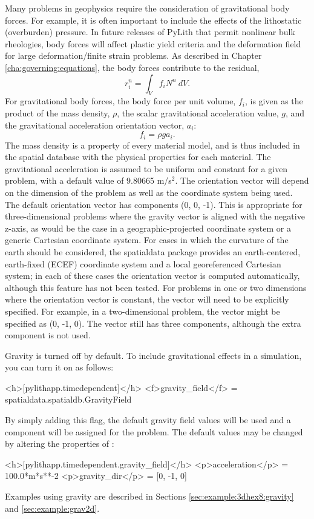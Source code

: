 Many problems in geophysics require the consideration of gravitational
body forces. For example, it is often important to include the effects
of the lithostatic (overburden) pressure. In future releases of PyLith
that permit nonlinear bulk rheologies, body forces will affect plastic
yield criteria and the deformation field for large deformation/finite
strain problems. As described in Chapter \vref{cha:governing:equations},
the body forces contribute to the residual,
\begin{equation}
r_{i}^{n}=\int_{V}f_{i}N^{n}\: dV.
\end{equation}
For gravitational body forces, the body force per unit volume, $f_{i}$,
is given as the product of the mass density, $\rho$, the scalar gravitational
acceleration value, $g$, and the gravitational acceleration orientation
vector, $a_{i}$:
\begin{equation}
f_{i}=\rho ga_{i}.
\end{equation}
The mass density is a property of every material model, and is thus
included in the spatial database with the physical properties for
each material. The gravitational acceleration is assumed to be uniform
and constant for a given problem, with a default value of 9.80665
m/s$^{\text{2}}$. The orientation vector will depend on the dimension
of the problem as well as the coordinate system being used. The default
orientation vector has components (0, 0, -1). This is appropriate
for three-dimensional problems where the gravity vector is aligned
with the negative z-axis, as would be the case in a geographic-projected
coordinate system or a generic Cartesian coordinate system. For cases
in which the curvature of the earth should be considered, the spatialdata
package provides an earth-centered, earth-fixed (ECEF) coordinate
system and a local georeferenced Cartesian system; in each of these
cases the orientation vector is computed automatically, although this
feature has not been tested. For problems in one or two dimensions
where the orientation vector is constant, the vector will need to
be explicitly specified. For example, in a two-dimensional problem,
the vector might be specified as (0, -1, 0). The vector still has
three components, although the extra component is not used.

Gravity is turned off by default. To include gravitational effects
in a simulation, you can turn it on as follows:
\begin{cfg}
<h>[pylithapp.timedependent]</h>
<f>gravity_field</f> = spatialdata.spatialdb.GravityField
\end{cfg}
By simply adding this flag, the default gravity field values will
be used and a  component will be assigned for
the problem. The default values may be changed by altering the properties
of :
\begin{cfg}
<h>[pylithapp.timedependent.gravity_field]</h>
<p>acceleration</p> = 100.0*m*s**-2
<p>gravity_dir</p> = [0, -1, 0]
\end{cfg}
Examples using gravity are described in Sections \vref{sec:example:3dhex8:gravity}
and \vref{sec:example:grav2d}.

